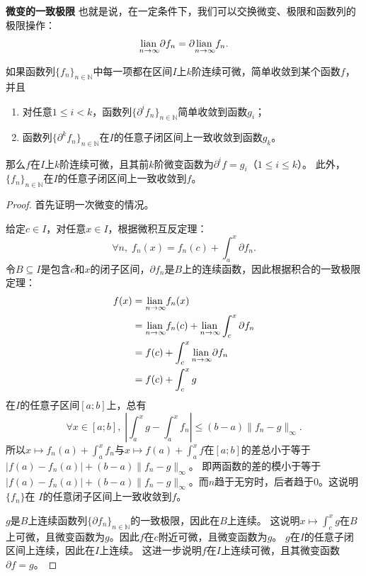 \documentclass[12pt,UTF8,fontset=none]{ctexbook}
\begin{document}
\begin{appendix}
\begin{tm}{\textbf{微变的一致极限}}
    也就是说，在一定条件下，我们可以交换微变、极限和函数列的极限操作：
    $$ \underset{n\to \infty}{\operatorname{lian}\,} \partial f_n = \partial \underset{n\to \infty}{\operatorname{lian}\,} f_n. $$

    如果函数列$\{f_n\}_{n\in\mathbb{N}}$中每一项都在区间$I$上$k$阶连续可微，简单收敛到某个函数$f$，并且
    \begin{enumerate}
        \item 对任意$1 \leqslant i < k$，函数列$\{\partial^i f_n\}_{n\in\mathbb{N}}$简单收敛到函数$g_i$；
        \item 函数列$\{\partial^k f_n\}_{n\in\mathbb{N}}$在$I$的任意子闭区间上一致收敛到函数$g_k$。
    \end{enumerate}
    那么$f$在$I$上$k$阶连续可微，且其前$k$阶微变函数为$\partial^i f = g_i$（$1 \leqslant i\leqslant k$）。
    此外，$\{f_n\}_{n\in\mathbb{N}}$在$I$的任意子闭区间上一致收敛到$f$。

\end{tm}

\begin{proof}
    首先证明一次微变的情况。
    
    给定$c\in I$，对任意$x\in I$，根据微积互反定理：
    $$ \forall n,\; f_n(x) = f_n(c) + \int_a^x \partial f_n. $$
    令$B\subseteq I$是包含$c$和$x$的闭子区间，$\partial f_n$是$B$上的连续函数，因此根据积合的一致极限定理：
    \begin{align*}
        f(x) &= \underset{n\to\infty}{\operatorname{lian}\,} f_n(x) \\
        &= \underset{n\to\infty}{\operatorname{lian}\,} f_n(c) + \underset{n\to\infty}{\operatorname{lian}\,} \int_c^x \partial f_n \\
        &= f(c) + \int_c^x \underset{n\to\infty}{\operatorname{lian}\,} \partial f_n \\
        &= f(c) + \int_c^x g
    \end{align*}
    在$I$的任意子区间$[a;b]$上，总有
    $$ \forall x \in [a;b], \; \left|\int_a^x g - \int_a^x f_n \right| \leqslant (b - a) \|f_n - g\|_{\infty}.$$
    所以$x\mapsto f_n(a) + \int_a^x f_n$与$x\mapsto f(a) + \int_a^x f$在$[a;b]$的差总小于等于$|f(a) - f_n(a)| + (b - a) \|f_n - g\|_{\infty}$。
    即两函数的差的模小于等于$|f(a) - f_n(a)| + (b - a) \|f_n - g\|_{\infty}$。而$n$趋于无穷时，后者趋于$0$。这说明$\{f_n\}$在
    $I$的任意闭子区间上一致收敛到$f$。

    $g$是$B$上连续函数列$\{\partial f_n\}_{n\in\mathbb{N}}$的一致极限，因此在$B$上连续。
    这说明$x\mapsto \int_c^x g $在$B$上可微，且微变函数为$g$。因此$f$在$c$附近可微，且微变函数为$g$。
    $g$在$I$的任意子闭区间上连续，因此在$I$上连续。
    这进一步说明$f$在$I$上连续可微，且其微变函数$\partial f = g$。
    

\end{proof}
\end{appendix}
\end{document}
